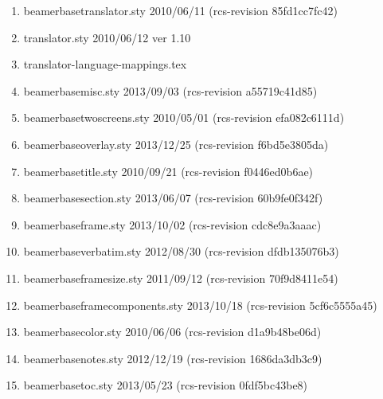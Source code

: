 \begin{enumerate}
\item beamerbasetranslator.sty 2010/06/11 (rcs-revision 85fd1cc7fc42)
\item translator.sty 2010/06/12 ver 1.10
\item translator-language-mappings.tex
\item beamerbasemisc.sty 2013/09/03 (rcs-revision a55719c41d85)
\item beamerbasetwoscreens.sty 2010/05/01 (rcs-revision efa082c6111d)
\item beamerbaseoverlay.sty 2013/12/25 (rcs-revision f6bd5e3805da)
\item beamerbasetitle.sty 2010/09/21 (rcs-revision f0446ed0b6ae)
\item beamerbasesection.sty 2013/06/07 (rcs-revision 60b9fe0f342f)
\item beamerbaseframe.sty 2013/10/02 (rcs-revision cdc8e9a3aaac)
\item beamerbaseverbatim.sty 2012/08/30 (rcs-revision dfdb135076b3)
\item beamerbaseframesize.sty 2011/09/12 (rcs-revision 70f9d8411e54)
\item beamerbaseframecomponents.sty 2013/10/18 (rcs-revision 5cf6c5555a45)
\item beamerbasecolor.sty 2010/06/06 (rcs-revision d1a9b48be06d)
\item beamerbasenotes.sty 2012/12/19 (rcs-revision 1686da3db3c9)
\item beamerbasetoc.sty 2013/05/23 (rcs-revision 0fdf5bc43be8)

\end{enumerate}
